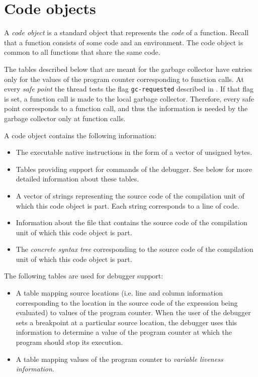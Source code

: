 \section{Code objects}
\label{data-representation-code-objects}

A \emph{code object} is a standard object that represents the
\emph{code} of a function.  Recall that a function consists of some
code and an environment.  The code object is common to all functions
that share the same code.

The tables described below that are meant for the garbage collector
have entries only for the values of the program counter corresponding
to function calls.  At every \emph{safe point} the thread tests the
flag \texttt{gc-requested} described in
.
If that flag is set, a function call is made to the local garbage
collector.  Therefore, every safe point corresponds to a function
call, and thus the information is needed by the garbage collector only
at function calls.

A code object contains the following information:

\begin{itemize}
\item The executable native instructions in the form of a vector of
  unsigned bytes.
\item Tables providing support for commands of the debugger.  See
  below for more detailed information about these tables.
\item A vector of strings representing the source code of the
  compilation unit of which this code object is part.  Each string
  corresponds to a line of code.
\item Information about the file that contains the source code of the
  compilation unit of which this code object is part.
\item The \emph{concrete syntax tree} corresponding to the source code
  of the compilation unit of which this code object is part.
\end{itemize}

The following tables are used for debugger support:

\begin{itemize}
\item A table mapping source locations (i.e. line and column
  information corresponding to the location in the source code of the
  expression being evaluated) to values of the program counter.  When
  the user of the debugger sets a breakpoint at a particular source
  location, the debugger uses this information to determine a value of
  the program counter at which the program should stop its execution.
\item A table mapping values of the program counter to \emph{variable
  liveness information}.
\end{itemize}

